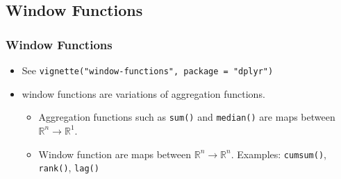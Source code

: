 \documentclass{beamer}\usepackage[]{graphicx}\usepackage[]{color}
\begin{document}
\subsection{Window Functions}%
\begin{frame}[fragile]
  \frametitle{Window Functions}
  \begin{itemize}
    \item See {\tt vignette("window-functions", package = "dplyr")}

    \item window functions are variations of aggregation functions.

      \begin{itemize}
        \item Aggregation functions such as {\tt sum()} and {\tt median()} are
          maps between $\mathbb{R}^n \rightarrow \mathbb{R}^1$.
        \item Window function are maps between $\mathbb{R}^n \rightarrow \mathbb{R}^n.$
          Examples: {\tt cumsum()}, {\tt rank()}, {\tt lag()}
      \end{itemize} 
  \end{itemize} 
\end{frame} 
\end{document}
